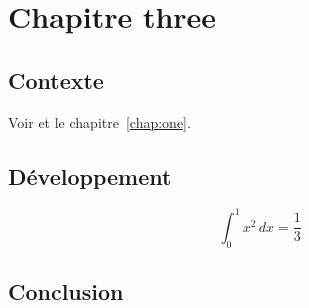 \chapter{Chapitre three}\label{chap:three}
\section{Contexte}
\lipsum[1-16]
Voir \cite{knuth1984} et le chapitre~\ref{chap:one}.
\section{Développement}
\lipsum[17-32]
\begin{equation}
  \int_0^1 x^2 \, dx = \frac{1}{3}
\end{equation}
\section{Conclusion}
\lipsum[33-48]
